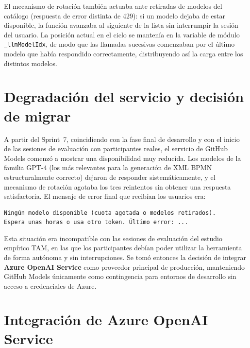 El mecanismo de rotación también actuaba ante retiradas de modelos del catálogo (respuesta de error distinta de 429): si un modelo dejaba de estar disponible, la función avanzaba al siguiente de la lista sin interrumpir la sesión del usuario. La posición actual en el ciclo se mantenía en la variable de módulo \texttt{\_llmModelIdx}, de modo que las llamadas sucesivas comenzaban por el último modelo que había respondido correctamente, distribuyendo así la carga entre los distintos modelos.

\section{Degradación del servicio y decisión de migrar}
\label{sec:anx2-interrupcion}

A partir del Sprint~7, coincidiendo con la fase final de desarrollo y con el inicio de las sesiones de evaluación con participantes reales, el servicio de GitHub Models comenzó a mostrar una disponibilidad muy reducida. Los modelos de la familia GPT-4 (los más relevantes para la generación de XML BPMN estructuralmente correcto) dejaron de responder sistemáticamente, y el mecanismo de rotación agotaba los tres reintentos sin obtener una respuesta satisfactoria. El mensaje de error final que recibían los usuarios era:

\begin{lstlisting}[style=promptbox]
Ningún modelo disponible (cuota agotada o modelos retirados).
Espera unas horas o usa otro token. Último error: ...
\end{lstlisting}

Esta situación era incompatible con las sesiones de evaluación del estudio empírico TAM, en las que los participantes debían poder utilizar la herramienta de forma autónoma y sin interrupciones. Se tomó entonces la decisión de integrar \textbf{Azure OpenAI Service} como proveedor principal de producción, manteniendo GitHub Models únicamente como contingencia para entornos de desarrollo sin acceso a credenciales de Azure.

\section{Integración de Azure OpenAI Service}
\label{sec:anx2-azure}

